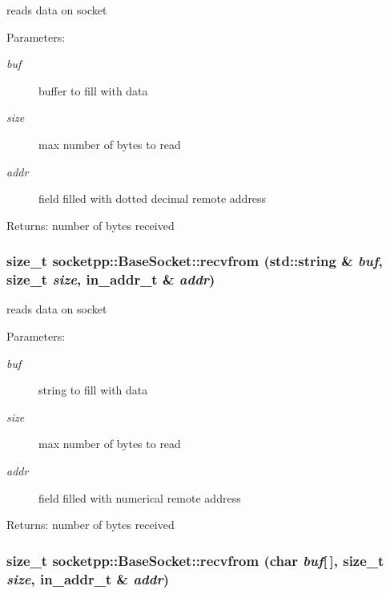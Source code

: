 reads data on socket 

\begin{Desc}
\item[Parameters:]
\begin{description}
\item[{\em buf}]buffer to fill with data \item[{\em size}]max number of bytes to read \item[{\em addr}]field filled with dotted decimal remote address \end{description}
\end{Desc}
\begin{Desc}
\item[Returns:]number of bytes received \end{Desc}
\hypertarget{classsocketpp_1_1BaseSocket_8224b8434da862a72b774a3c80006fcb}{
\subsubsection[{recvfrom}]{\setlength{\rightskip}{0pt plus 5cm}size\_\-t socketpp::BaseSocket::recvfrom (std::string \& {\em buf}, \/  size\_\-t {\em size}, \/  in\_\-addr\_\-t \& {\em addr})}}
\label{classsocketpp_1_1BaseSocket_8224b8434da862a72b774a3c80006fcb}


reads data on socket 

\begin{Desc}
\item[Parameters:]
\begin{description}
\item[{\em buf}]string to fill with data \item[{\em size}]max number of bytes to read \item[{\em addr}]field filled with numerical remote address \end{description}
\end{Desc}
\begin{Desc}
\item[Returns:]number of bytes received \end{Desc}
\hypertarget{classsocketpp_1_1BaseSocket_ed28eb7e4a5abee65143bcdf162673f4}{
\subsubsection[{recvfrom}]{\setlength{\rightskip}{0pt plus 5cm}size\_\-t socketpp::BaseSocket::recvfrom (char {\em buf}\mbox{[}$\,$\mbox{]}, \/  size\_\-t {\em size}, \/  in\_\-addr\_\-t \& {\em addr})}}
\label{classsocketpp_1_1BaseSocket_ed28eb7e4a5abee65143bcdf162673f4}


